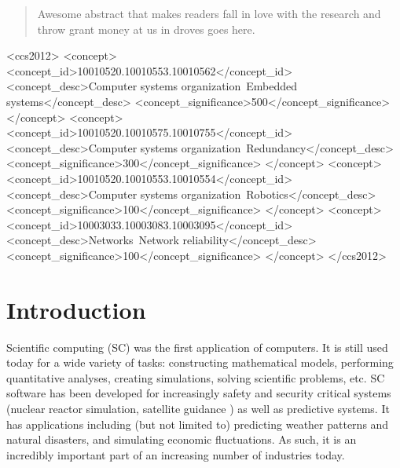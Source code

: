 \documentclass{sig-alternate-05-2015}
\begin{document}
\maketitle
\begin{abstract}
Awesome abstract that makes readers fall in love with the research
and throw grant money at us in droves goes here.
\end{abstract}


%
%

\begin{CCSXML}
<ccs2012>
 <concept>
  <concept_id>10010520.10010553.10010562</concept_id>
  <concept_desc>Computer systems organization~Embedded systems</concept_desc>
  <concept_significance>500</concept_significance>
 </concept>
 <concept>
  <concept_id>10010520.10010575.10010755</concept_id>
  <concept_desc>Computer systems organization~Redundancy</concept_desc>
  <concept_significance>300</concept_significance>
 </concept>
 <concept>
  <concept_id>10010520.10010553.10010554</concept_id>
  <concept_desc>Computer systems organization~Robotics</concept_desc>
  <concept_significance>100</concept_significance>
 </concept>
 <concept>
  <concept_id>10003033.10003083.10003095</concept_id>
  <concept_desc>Networks~Network reliability</concept_desc>
  <concept_significance>100</concept_significance>
 </concept>
</ccs2012>  
\end{CCSXML}



%
%

%
%
\printccsdesc


\section{Introduction}
Scientific computing (SC) was the first application of computers. It is still
used today for a wide variety of tasks: constructing mathematical models,
performing quantitative analyses, creating simulations, solving scientific
problems, etc. SC software has been developed for increasingly safety and
security critical systems (nuclear reactor simulation, satellite
guidance%
) as well as predictive
systems.
It has applications including (but not limited to) predicting weather patterns
and natural disasters, and simulating economic fluctuations. As such, it is an
incredibly important part of an increasing number of industries
today.
\end{document}
